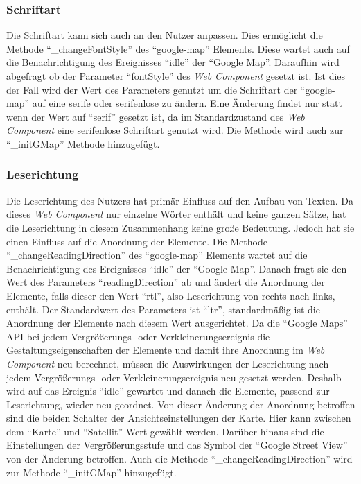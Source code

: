 \documentclass[12pt, paper=a4, bibtotoc, toc=listof, headsepline=true, numbers=endperiod]{scrreprt}
\begin{document}
	\subsubsection{Schriftart}
	Die Schriftart kann sich auch an den Nutzer anpassen. Dies ermöglicht die Methode \enquote{\_changeFontStyle} des \enquote{google-map} Elements. Diese wartet auch auf die Benachrichtigung des Ereignisses \enquote{idle} der \enquote{Google Map}. Daraufhin wird abgefragt ob der Parameter \enquote{fontStyle} des \emph{Web Component} gesetzt ist. Ist dies der Fall wird der Wert des Parameters genutzt um die Schriftart der \enquote{google-map} auf eine serife oder serifenlose zu ändern. Eine Änderung findet nur statt wenn der Wert auf \enquote{serif} gesetzt ist, da im Standardzustand des \emph{Web Component} eine serifenlose Schriftart genutzt wird. Die Methode wird auch zur \enquote{\_initGMap} Methode hinzugefügt.
	\subsubsection{Leserichtung}
	Die Leserichtung des Nutzers hat primär Einfluss auf den Aufbau von Texten. Da dieses \emph{Web Component} nur einzelne Wörter enthält und keine ganzen Sätze, hat die Leserichtung in diesem Zusammenhang keine große Bedeutung. Jedoch hat sie einen Einfluss auf die Anordnung der Elemente. Die Methode \enquote{\_changeReadingDirection} des \enquote{google-map} Elements wartet auf die Benachrichtigung des Ereignisses \enquote{idle} der \enquote{Google Map}. Danach fragt sie den Wert des Parameters \enquote{readingDirection} ab und ändert die Anordnung der Elemente, falls dieser den Wert \enquote{rtl}, also Leserichtung von rechts nach links, enthält. Der Standardwert des Parameters ist \enquote{ltr}, standardmäßig ist die Anordnung der Elemente nach diesem Wert ausgerichtet. Da die \enquote{Google Maps} \ac{API} bei jedem Vergrößerungs- oder Verkleinerungsereignis die Gestaltungseigenschaften der Elemente und damit ihre Anordnung im \emph{Web Component} neu berechnet, müssen die Auswirkungen der Leserichtung nach jedem Vergrößerungs- oder Verkleinerungsereignis neu gesetzt werden. Deshalb wird auf das Ereignis \enquote{idle} gewartet und danach die Elemente, passend zur Leserichtung, wieder neu geordnet. Von dieser Änderung der Anordnung betroffen sind die beiden Schalter der Ansichtseinstellungen der Karte. Hier kann zwischen dem \enquote{Karte} und \enquote{Satellit} Wert gewählt werden. Darüber hinaus sind die Einstellungen der Vergrößerungsstufe und das Symbol der \enquote{Google Street View} von der Änderung betroffen. Auch die Methode \enquote{\_changeReadingDirection} wird zur Methode \enquote{\_initGMap} hinzugefügt.
	\newpage
\end{document}
